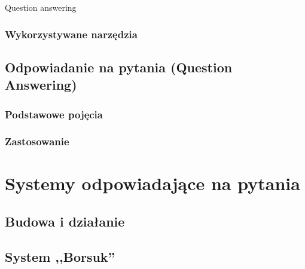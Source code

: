 \documentclass[a4paper, twoside, 12pt]{report}
\begin{document}
            Question answering

        \subsection{Wykorzystywane narzędzia}
    \section{Odpowiadanie na pytania (Question Answering)}
        \subsection{Podstawowe pojęcia}
        \subsection{Zastosowanie}
\chapter{Systemy odpowiadające na pytania}
    \section{Budowa i działanie}
    \section{System ,,Borsuk''}

\clearpage
{}


\end{document}
